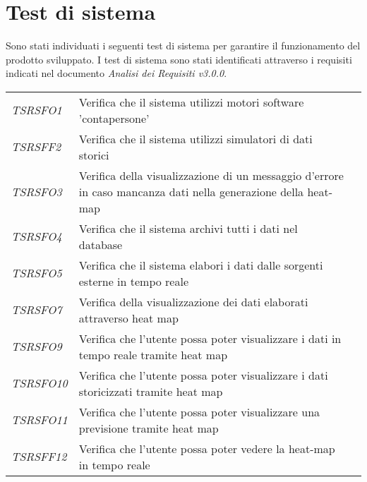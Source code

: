 \section{Test di sistema}\label{TestDiSistema}
Sono stati individuati i seguenti test di sistema per garantire il funzionamento del prodotto sviluppato. I test di sistema sono stati identificati attraverso i requisiti indicati nel documento \textit{Analisi dei Requisiti v3.0.0}. 
\def\tabularxcolumn#1{m{#1}}
{
	
	\begin{center}
		\renewcommand{\arraystretch}{1.4}
		\begin{longtable}{|p{3cm}|p{8cm}|p{3cm}|}
			\hline
			\rowcolor{airforceblue}
			\makecell[c]{\textbf{Id Test}} & \makecell[c]{\textbf{Descrizione}} & \makecell[c]{\textbf{Esito}} \\
			\hline
			\textit{TSRSFO1} & Verifica che il sistema utilizzi motori software 'contapersone' & \makecell[tc]{\textit{NI}} \\
			\hline
			\textit{TSRSFF2} & Verifica che il sistema utilizzi simulatori di dati storici & \makecell[tc]{\textit{NI}}\\
			\hline
			\textit{TSRSFO3} & Verifica della visualizzazione di un messaggio d'errore in caso mancanza dati nella generazione della heat-map &\makecell[tc]{\textit{NI}}\\
			\hline
			\textit{TSRSFO4} & Verifica che il sistema archivi tutti i dati nel database & \makecell[tc]{\textit{NI}}\\
			\hline
			\textit{TSRSFO5} & Verifica che il sistema elabori i dati dalle sorgenti esterne in tempo reale & \makecell[tc]{\textit{NI}}\\
			\hline
			\textit{TSRSFO7} & Verifica della visualizzazione dei dati elaborati attraverso heat map & \makecell[tc]{\textit{NI}}\\
			\hline
			\textit{TSRSFO9} & Verifica che l’utente possa poter visualizzare i dati in tempo reale tramite heat map & \makecell[tc]{\textit{NI}}\\
			\hline
			\textit{TSRSFO10} & Verifica che l’utente possa poter visualizzare i dati storicizzati tramite heat map & \makecell[tc]{\textit{NI}}\\
			\hline
			\textit{TSRSFO11} & Verifica che l’utente possa poter visualizzare una previsione tramite heat map & \makecell[tc]{\textit{NI}}\\
			\hline
			\textit{TSRSFF12} & Verifica che l'utente possa poter vedere la heat-map in tempo reale & \makecell[tc]{\textit{NI}}\\

\end{longtable}
\end{center}}

